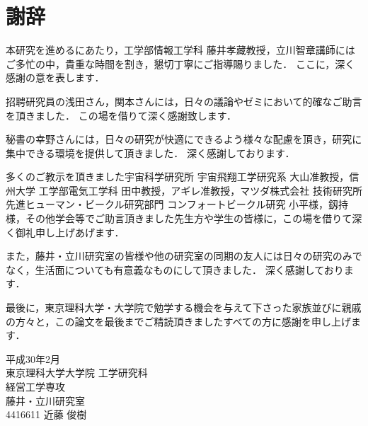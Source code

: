 \documentclass[../main/main]{subfiles}
\begin{document}
\chapter*{謝辞}

本研究を進めるにあたり，工学部情報工学科 藤井孝藏教授，立川智章講師にはご多忙の中，貴重な時間を割き，懇切丁寧にご指導賜りました．
ここに，深く感謝の意を表します．

招聘研究員の浅田さん，関本さんには，日々の議論やゼミにおいて的確なご助言を頂きました．
この場を借りて深く感謝致します．

秘書の幸野さんには，日々の研究が快適にできるよう様々な配慮を頂き，研究に集中できる環境を提供して頂きました．
深く感謝しております．

多くのご教示を頂きました宇宙科学研究所 宇宙飛翔工学研究系 大山准教授，信州大学 工学部電気工学科 田中教授，アギレ准教授，マツダ株式会社 技術研究所 先進ヒューマン・ビークル研究部門 コンフォートビークル研究 小平様，釼持様，その他学会等でご助言頂きました先生方や学生の皆様に，この場を借りて深く御礼申し上げあげます．

また，藤井・立川研究室の皆様や他の研究室の同期の友人には日々の研究のみでなく，生活面についても有意義なものにして頂きました．
深く感謝しております．

最後に，東京理科大学・大学院で勉学する機会を与えて下さった家族並びに親戚の方々と，この論文を最後までご精読頂きましたすべての方に感謝を申し上げます．

\vspace{1in}

\begin{flushright}
平成30年2月\\
東京理科大学大学院 工学研究科\\
経営工学専攻\\
藤井・立川研究室\\
4416611 近藤 俊樹
\end{flushright}
\end{document}
